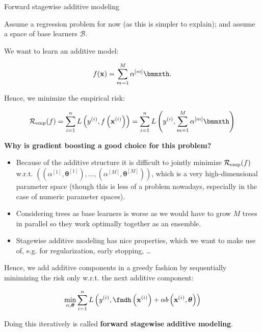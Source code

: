 \begin{vbframe}{Forward stagewise additive modeling}

Assume a regression problem for now (as this is simpler to explain);
and assume a space of base learners $\mathcal{B}$.

\lz



We want to learn an additive model:

$$
\fx = \sum_{m=1}^M \alpha^{[m]} \bmmxth.
$$

Hence, we minimize the empirical risk:

$$
\riskef = \sum_{i=1}^n L\left(\yi,\fxi \right) =
\sum_{i=1}^n L\left(\yi, \sum_{m=1}^M \alpha^{[m]} \bmmxth\right)
$$







\framebreak
\textbf{Why is gradient boosting a good choice for this problem?}
\begin{itemize}
\item Because of the additive structure it is difficult to jointly minimize $\mathcal{R}_{\text{emp}}(f)$ w.r.t. $\left(\left(\alpha^{[1]}, \bm{\theta}^{[1]}\right), \ldots, \left(\alpha^{[M]}, \bm{\theta}^{[M]}\right)\right)$, which is a very high-dimensional parameter space (though this is less of a problem nowadays, especially in the
case of numeric parameter spaces).
\item Considering trees as base learners is worse as we would have to grow $M$ trees in parallel so they
  work optimally together as an ensemble.
\item Stagewise additive modeling has nice properties, which we want to make use of, e.g. for regularization, early stopping, \dots
\end{itemize}

\framebreak

Hence, we add additive components in a greedy fashion by sequentially minimizing the risk only w.r.t. the next additive component:

$$ \min \limits_{\alpha, \bm{\theta}} \sum_{i=1}^n L\left(\yi, \fmdh\left(\xi\right) + \alpha b\left(\xi, \bm{\theta}\right)\right) $$

\lz

Doing this iteratively is called \textbf{forward stagewise additive modeling}.



\end{vbframe}


